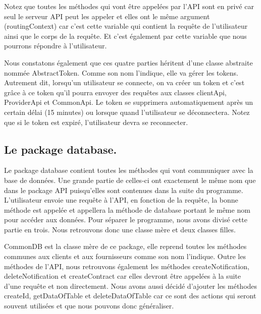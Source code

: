 \begin{flushleft}
Notez que toutes les méthodes qui vont être appelées par l'API sont en privé car seul le serveur API peut les appeler et elles ont  le même argument (routingContext) car c'est cette variable qui contient la requête de l'utilisateur ainsi que le corps de la requête. Et c'est également par cette variable que nous pourrons répondre à l'utilisateur.
\end{flushleft}

\begin{flushleft}
Nous constatons également que ces quatre parties héritent d'une classe abstraite nommée AbstractToken. Comme son nom l'indique, elle va gérer les tokens. Autrement dit, lorsqu'un utilisateur se connecte, on va créer un token et c'est grâce à ce token qu'il pourra envoyer des requêtes aux classes clientApi, ProviderApi et CommonApi. Le token se supprimera automatiquement après un certain délai (15 minutes) ou lorsque quand l'utilisateur se déconnectera.
\newline
Notez que si le token est expiré, l'utilisateur devra se reconnecter.
\end{flushleft}

\subsection{Le package database.}

\begin{flushleft}
Le package database contient toutes les méthodes qui vont communiquer avec la base de données. Une grande partie de celles-ci ont exactement le même nom que dans le package API puisqu’elles sont contenues dans la suite du programme. L'utilisateur envoie une requête à l'API, en fonction de la requête, la bonne méthode est appelée et appellera la méthode de database portant le même nom pour accéder aux données. Pour séparer le programme, nous avons divisé  cette partie en trois. Nous retrouvons donc une classe mère et deux classes filles.
\end{flushleft}

\begin{flushleft}
CommonDB est la classe mère de ce package, elle reprend toutes les méthodes communes aux clients et aux fournisseurs comme son nom l'indique. Outre les méthodes de l'API, nous retrouvons également les méthodes createNotification, deleteNotification et createContract car elles devront être appelées à la suite d'une requête et non directement. Nous avons aussi décidé d'ajouter les méthodes createId, getDataOfTable et deleteDataOfTable car ce sont des actions qui seront souvent utilisées et que nous pouvons donc généraliser.
\end{flushleft}

